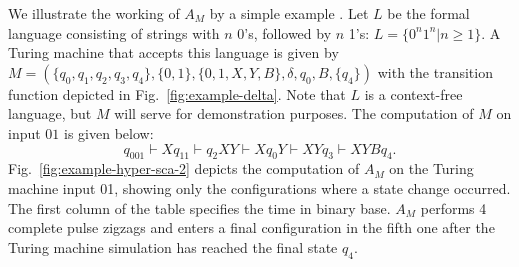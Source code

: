 \documentclass{article}
\theoremstyle{definition}
\begin{document}
We illustrate the working of $A_M$ by a simple example \cite{2008-sica}.
Let $L$ be the formal language consisting of strings with $n$ 0's, followed by $n$ 1's:
$L = \{0^n1^n | n \geq 1\}$.
A Turing machine that accepts this language is given by
$M = (\{q_0, q_1, q_2, q_3, q_4\}, \{0,1\}, \{0,1,X,Y,B\}, \delta, q_0, B, \{q_4\})$ \cite{hopcroft}
with the transition function depicted in Fig.~\ref{fig:example-delta}.
Note that $L$ is a context-free language, but $M$ will serve for demonstration purposes.
The computation of $M$ on input $01$ is given below:
\[
q_001 \vdash Xq_11  \vdash  q_2XY  \vdash  Xq_0Y  \vdash  XYq_3  \vdash XYBq_4.
\]
Fig.~\ref{fig:example-hyper-sca-2} depicts the computation of $A_M$ on the Turing machine input 01, 
showing only the configurations where a state change occurred.
The first column of the table specifies the time in binary base.
$A_M$ performs 4 complete pulse zigzags and enters a final configuration in the fifth one after the Turing machine simulation has reached
the final state $q_4$.
\end{document}
